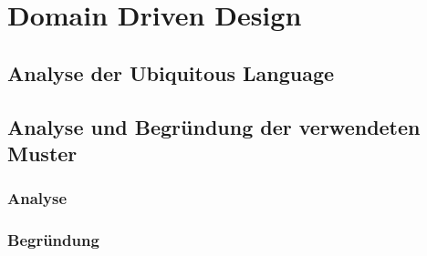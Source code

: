 
\chapter{Domain Driven Design}

	\section{Analyse der Ubiquitous Language}
	
	\section{Analyse und Begründung der verwendeten Muster}
		
		\subsection{Analyse}
		
		\subsection{Begründung}